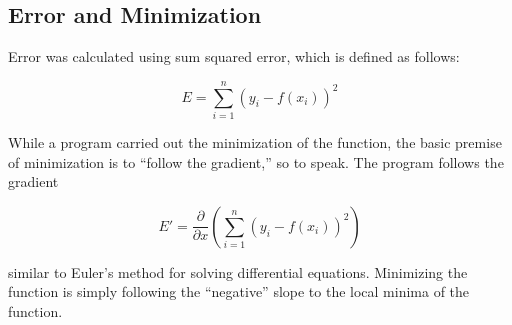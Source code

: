 \documentclass[a4paper]{article}
\begin{document}
        \subsection{Error and Minimization}
            \centerline{Error was calculated using sum squared error, which is defined as follows:}
            \begin{equation}
                E=\displaystyle\sum_{i=1}^n{(y_i-f(x_i))^2}
            \end{equation}
            \begin{center}
                While a program carried out the minimization of the function, the basic
                premise of minimization is to ``follow the gradient,'' so to speak. The
                program follows the gradient
            \end{center}
            \begin{equation}
                E'=\frac{\partial}{\partial x}(\displaystyle\sum_{i=1}^n{(y_i-f(x_i))^2})
            \end{equation}
            \begin{center}
                similar to Euler's method for solving differential equations. Minimizing
                the function is simply following the ``negative'' slope to the local minima
                of the function.
            \end{center}
\end{document}
